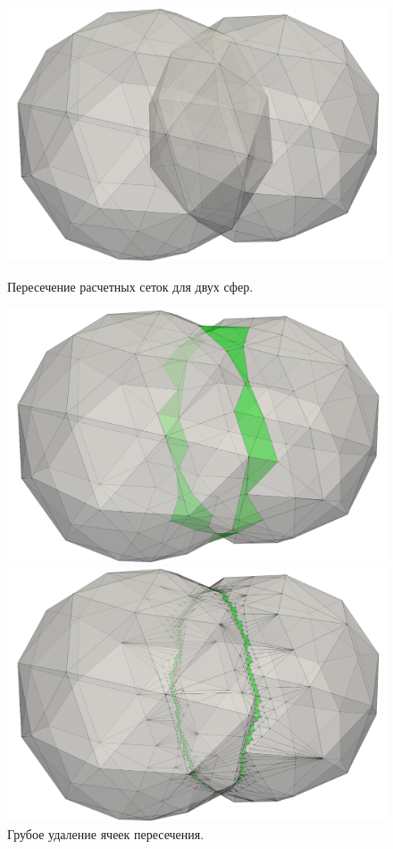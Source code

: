 \begin{figure}[h]
  \centering
  \begin{minipage}[h]{0.32\textwidth}
    \includegraphics[width=\textwidth]{pics/pic_zip_01.png}
    \caption{Пересечение расчетных сеток для двух сфер.}\label{fig:pic_zip_01}
  \end{minipage}
  \hfill
  \begin{minipage}[h]{0.32\textwidth}
    \includegraphics[width=\textwidth]{pics/pic_zip_09.png}
    \caption{Грубое удаление ячеек пересечения.}\label{fig:pic_zip_09}
  \end{minipage}
  \hfill
  \begin{minipage}[h]{0.32\textwidth}
    \includegraphics[width=\textwidth]{pics/pic_zip_15.png}

\end{minipage}
\end{figure}

